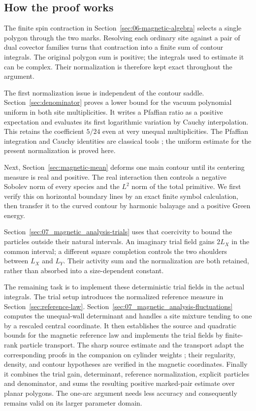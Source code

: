 \subsection{How the proof works}

The finite spin contraction in Section~\ref{sec:06-magnetic-algebra}
selects a single polygon through the two marks. Resolving each ordinary
site against a pair of dual covector families turns that contraction
into a finite sum of contour integrals. The original polygon sum is
positive; the integrals used to estimate it can be complex. Their
normalization is therefore kept exact throughout the argument.

The first normalization issue is independent of the contour saddle.
Section~\ref{sec:denominator} proves a lower bound for the vacuum
polynomial uniform in both site multiplicities. It writes a Pfaffian
ratio as a positive expectation and evaluates its first logarithmic
variation by Cauchy interpolation. This retains the coefficient
$5/24$ even at very unequal multiplicities. The Pfaffian integration
and Cauchy identities are classical tools
\cite{deBruijn1955,IshikawaOkadaTagawaZeng2006}; the uniform estimate
for the present normalization is proved here.

Next, Section~\ref{sec:magnetic-mean} deforms one main contour until its
centering measure is real and positive. The real interaction then
controls a negative Sobolev norm of every species and the $L^2$ norm
of the total primitive. We first verify this on horizontal boundary
lines by an exact finite symbol calculation, then transfer it to the
curved contour by harmonic balayage and a positive Green energy.

Section~\ref{sec:07_magnetic_analysis-trials} uses that coercivity to
bound the particles outside their natural intervals. An imaginary
trial field gains $2L_X$ in the common interval; a different square
completion controls the two shoulders between $L_X$ and $L_Y$.
Their activity sum and the normalization are both retained, rather
than absorbed into a size-dependent constant.

The remaining task is to implement these deterministic trial fields in
the actual integrals. The trial setup introduces the normalized reference
measure in Section~\ref{sec:reference-law}.
Section~\ref{sec:07_magnetic_analysis-fluctuations} computes the
unequal-wall determinant and handles a site mixture tending to one by a
rescaled central coordinate. It then establishes the source and quadratic
bounds for the magnetic reference law and implements the trial fields
by finite-rank particle transport. The sharp source estimate and the
transport adapt the corresponding proofs in the companion on cylinder
weights \cite[Theorem~4.3 and Lemma~5.2]{Electric}; their regularity,
density, and contour hypotheses are verified in the magnetic coordinates.
Finally it combines the trial gain, determinant, reference normalization, explicit
particles and denominator, and sums the resulting positive marked-pair
estimate over planar polygons. The one-arc argument needs less accuracy
and consequently remains valid on its larger parameter domain.
